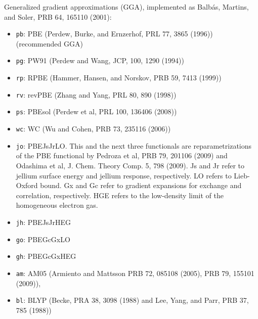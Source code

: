 \documentclass[11pt]{article}
\begin{document}
\begin{itemize}
\begin{itemize}
          Generalized gradient approximations (GGA), implemented as 
          Balb\'as, Martins, and Soler, PRB 64, 165110 (2001):
          \begin{itemize}
            \item {\tt pb}: PBE (Perdew, Burke, and Ernzerhof, 
                                 PRL 77, 3865 (1996)) (recommended GGA)
            \item {\tt pg}: PW91 (Perdew and Wang, JCP, 100, 1290 (1994))
            \item {\tt rp}: RPBE (Hammer, Hansen, and Norskov, 
                                  PRB 59, 7413 (1999))
            \item {\tt rv}: revPBE (Zhang and Yang, PRL 80, 890 (1998)) 
            \item {\tt ps}: PBEsol (Perdew et al, PRL 100, 136406 (2008))
            \item {\tt wc}: WC (Wu and Cohen, PRB 73, 235116 (2006))
            \item {\tt jo}: PBEJsJrLO. This and the next three functionals 
                            are reparametrizations of the PBE functional by
                            Pedroza et al, PRB 79, 201106 (2009) and
                            Odashima et al, J. Chem. Theory Comp. 5, 798 (2009).
                            Js and Jr refer to jellium surface energy and 
                            jellium response, respectively.
                            LO refers to Lieb-Oxford bound.
                            Gx and Gc refer to gradient expansions for 
                            exchange and correlation, respectively.
                            HGE refers to the low-density limit of the
                            homogeneous electron gas.
            \item {\tt jh}: PBEJsJrHEG
            \item {\tt go}: PBEGcGxLO
            \item {\tt gh}: PBEGcGxHEG
            \item {\tt am}: AM05 (Armiento and Mattsson 
                                  PRB 72, 085108 (2005), PRB 79, 155101 (2009)),
            \item {\tt bl}: BLYP (Becke, PRA 38, 3098 (1988) and
                                  Lee, Yang, and Parr, PRB 37, 785 (1988))
          \end{itemize}


\end{itemize}
\end{itemize}
\end{document}

